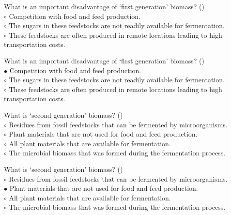 \documentclass[]{beamer}
\begin{document}
\begin{CJK}{UTF8}{gbsn}
\begin{frame}[shrink] {}
\addtocounter{questions}{1}
\color{blue}
What is an important disadvantage of ‘first generation’ biomass?
({})\\
\color{black}
\setlength{\parindent}{-0.4cm}
{\color{red}$\circ$}  Competition with food and feed production.  \\
{\color{red}$\circ$} The sugars in these feedstocks are not readily available for fermentation.  \\
{\color{red}$\circ$} These feedstocks are often produced in remote locations leading to high transportation costs.  \\
\end{frame}
\begin{frame}[shrink] {}
\addtocounter{answers}{1}
\color{blue}
What is an important disadvantage of ‘first generation’ biomass?
({})\\
\color{black}
\setlength{\parindent}{-0.4cm}
{\color{red}$\bullet$} Competition with food and feed production.  \\
{\color{red}$\circ$} The sugars in these feedstocks are not readily available for fermentation.  \\
{\color{red}$\circ$} These feedstocks are often produced in remote locations leading to high transportation costs.  \\
\end{frame}


\begin{frame}[shrink] {}
\addtocounter{questions}{1}
\color{blue}
What is ‘second generation’ biomass?
({})\\
\color{black}
\setlength{\parindent}{-0.4cm}
{\color{red}$\circ$} Residues from fossil feedstocks that can be fermented by microorganisms.  \\
{\color{red}$\circ$}  Plant materials that are not used for food and feed production.  \\
{\color{red}$\circ$} All plant materials that are available for fermentation.  \\
{\color{red}$\circ$} The microbial biomass that was formed during the fermentation process.  \\
\end{frame}
\begin{frame}[shrink] {}
\addtocounter{answers}{1}
\color{blue}
What is ‘second generation’ biomass?
({})\\
\color{black}
\setlength{\parindent}{-0.4cm}
{\color{red}$\circ$} Residues from fossil feedstocks that can be fermented by microorganisms.  \\
{\color{red}$\bullet$} Plant materials that are not used for food and feed production.  \\
{\color{red}$\circ$} All plant materials that are available for fermentation.  \\
{\color{red}$\circ$} The microbial biomass that was formed during the fermentation process.  \\
\end{frame}



\end{CJK}
\end{document}
